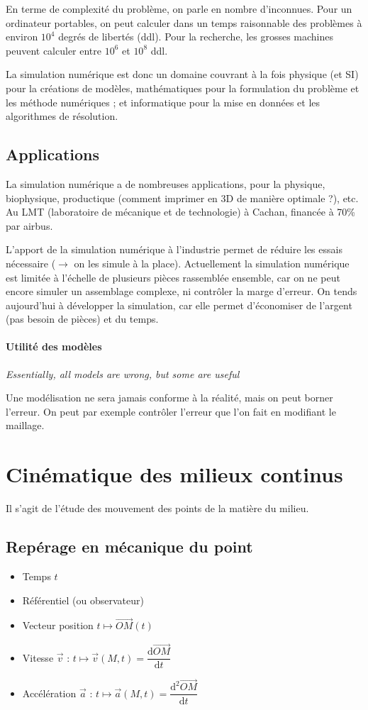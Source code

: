 \documentclass{article}
\newcommand{\deriv}{\mathrm{d}}
\begin{document}
En terme de complexité du problème, on parle en nombre d'inconnues. Pour un ordinateur portables, on peut calculer dans un temps raisonnable des problèmes à environ $10^4$ degrés de libertés (ddl). Pour la recherche, les grosses machines peuvent calculer entre $10^6$ et $10^8$ ddl.
\bigskip


La simulation numérique est donc un domaine couvrant à la fois physique (et SI) pour la créations de modèles, mathématiques pour la formulation du problème et les méthode numériques ; et informatique pour la mise en données et les algorithmes de résolution.


\subsection{Applications}
La simulation numérique a de nombreuses applications, pour la physique, biophysique, productique (comment imprimer en 3D de manière optimale ?), etc. Au LMT (laboratoire de mécanique et de technologie) à Cachan, financée à 70\% par airbus.

L'apport de la simulation numérique à l'industrie permet de réduire les essais nécessaire ($\to$ on les simule à la place). Actuellement la simulation numérique est limitée à l'échelle de plusieurs pièces rassemblée ensemble, car on ne peut encore simuler un assemblage complexe, ni contrôler la marge d'erreur. On tends aujourd'hui à développer la simulation, car elle permet d'économiser de l'argent (pas besoin de pièces) et du temps.


\paragraph{Utilité des modèles} \emph{Essentially, all models are wrong, but some are useful}

Une modélisation ne sera jamais conforme à la réalité, mais on peut borner l'erreur. On peut par exemple contrôler l'erreur que l'on fait en modifiant le maillage.


\section{Cinématique des milieux continus}
Il s'agit de l'étude des mouvement des points de la matière du milieu.

\subsection{Repérage en mécanique du point}
\begin{itemize}[label=\textbullet]
\item Temps $t$
\item Référentiel (ou observateur)
\item Vecteur position $t \mapsto \overrightarrow{OM}(t)$
\item Vitesse $\vec{v}$ : $t \mapsto \vec{v}(M,t) = \dfrac{\deriv \overrightarrow{OM}}{\deriv t}$
\item Accélération $\vec{a}$ : $t \mapsto \vec{a}(M,t) = \dfrac{\deriv^2 \overrightarrow{OM}}{\deriv t}$
\end{itemize}
\end{document}

